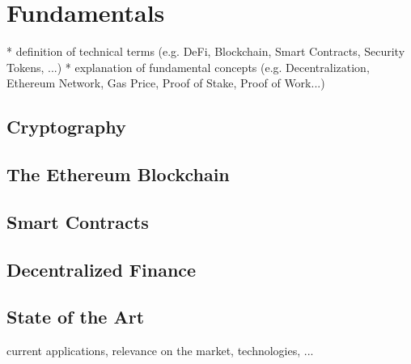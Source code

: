 \chapter{Fundamentals}
\label{cha:Fundamentals}

* definition of technical terms (e.g. DeFi, Blockchain, Smart Contracts, Security Tokens, ...)
* explanation of fundamental concepts (e.g. Decentralization, Ethereum Network, Gas Price, Proof of Stake, Proof of Work...)

\section{Cryptography}
\section{The Ethereum Blockchain}
\section{Smart Contracts}
\section{Decentralized Finance}
\section{State of the Art}
current applications, relevance on the market, technologies, ...